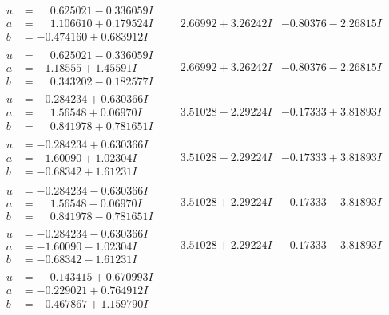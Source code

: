 \documentclass[1p]{elsarticle_modified}
\theoremstyle{definition}
\begin{document}
$$\begin{array}{c|c|c}
\begin{aligned}
u &= \phantom{-}0.625021 - 0.336059 I \\
a &= \phantom{-}1.106610 + 0.179524 I \\
b &= -0.474160 + 0.683912 I\end{aligned}
 & \phantom{-}2.66992 + 3.26242 I & -0.80376 - 2.26815 I \\ \hline\begin{aligned}
u &= \phantom{-}0.625021 - 0.336059 I \\
a &= -1.18555 + 1.45591 I \\
b &= \phantom{-}0.343202 - 0.182577 I\end{aligned}
 & \phantom{-}2.66992 + 3.26242 I & -0.80376 - 2.26815 I \\ \hline\begin{aligned}
u &= -0.284234 + 0.630366 I \\
a &= \phantom{-}1.56548 + 0.06970 I \\
b &= \phantom{-}0.841978 + 0.781651 I\end{aligned}
 & \phantom{-}3.51028 - 2.29224 I & -0.17333 + 3.81893 I \\ \hline\begin{aligned}
u &= -0.284234 + 0.630366 I \\
a &= -1.60090 + 1.02304 I \\
b &= -0.68342 + 1.61231 I\end{aligned}
 & \phantom{-}3.51028 - 2.29224 I & -0.17333 + 3.81893 I \\ \hline\begin{aligned}
u &= -0.284234 - 0.630366 I \\
a &= \phantom{-}1.56548 - 0.06970 I \\
b &= \phantom{-}0.841978 - 0.781651 I\end{aligned}
 & \phantom{-}3.51028 + 2.29224 I & -0.17333 - 3.81893 I \\ \hline\begin{aligned}
u &= -0.284234 - 0.630366 I \\
a &= -1.60090 - 1.02304 I \\
b &= -0.68342 - 1.61231 I\end{aligned}
 & \phantom{-}3.51028 + 2.29224 I & -0.17333 - 3.81893 I \\ \hline\begin{aligned}
u &= \phantom{-}0.143415 + 0.670993 I \\
a &= -0.229021 + 0.764912 I \\
b &= -0.467867 + 1.159790 I\end{aligned}

\end{array}$$
\end{document}
